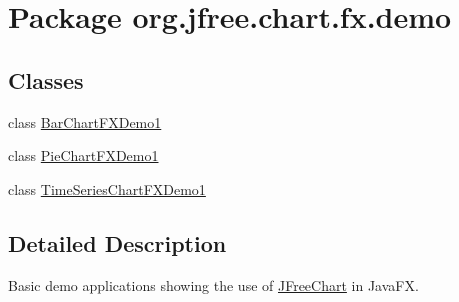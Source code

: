 \hypertarget{namespaceorg_1_1jfree_1_1chart_1_1fx_1_1demo}{}\section{Package org.\+jfree.\+chart.\+fx.\+demo}
\label{namespaceorg_1_1jfree_1_1chart_1_1fx_1_1demo}
\subsection*{Classes}
\begin{DoxyCompactItemize}
\item 
class \mbox{\hyperlink{classorg_1_1jfree_1_1chart_1_1fx_1_1demo_1_1_bar_chart_f_x_demo1}{Bar\+Chart\+F\+X\+Demo1}}
\item 
class \mbox{\hyperlink{classorg_1_1jfree_1_1chart_1_1fx_1_1demo_1_1_pie_chart_f_x_demo1}{Pie\+Chart\+F\+X\+Demo1}}
\item 
class \mbox{\hyperlink{classorg_1_1jfree_1_1chart_1_1fx_1_1demo_1_1_time_series_chart_f_x_demo1}{Time\+Series\+Chart\+F\+X\+Demo1}}
\end{DoxyCompactItemize}


\subsection{Detailed Description}
Basic demo applications showing the use of \mbox{\hyperlink{classorg_1_1jfree_1_1chart_1_1_j_free_chart}{J\+Free\+Chart}} in Java\+FX. 